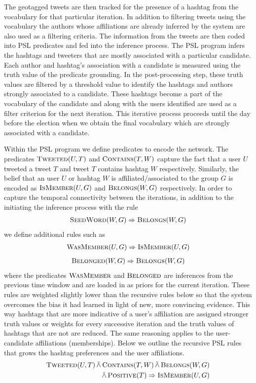 The geotagged tweets are then tracked for the presence of a hashtag from 
the vocabulary for that particular iteration.
In addition to filtering tweets using the vocabulary the authors whose affiliations are already inferred by the system are also used as a filtering criteria.
The information from
the tweets are then coded into PSL predicates and fed into the inference process.
The PSL program infers the hashtags and tweeters that are mostly associated with 
a particular candidate. 
Each author and hashtag's association with a candidate is measured using the truth value 
of the predicate grounding.
In the post-processing step, these truth values are filtered by a threshold value to identify the hashtags and authors strongly associated to a candidate.
These hashtags become a part of the vocabulary of the candidate and along with the users identified are used as a filter criterion for the next iteration.
This iterative process proceeds until the day before the election when we obtain the final vocabulary which are strongly associated with a candidate.

Within the PSL program we define predicates to encode the network. 
The predicates $\textsc{Tweeted}(U,T)$ and $\textsc{Contains}(T,W)$  capture the fact that a user $U$ tweeted a tweet $T$ and tweet $T$ contains hashtag $W$ respectively. 
Similarly, the belief that an user $U$ or hashtag $W$ is affiliated/associated to the group $G$ is encoded as $\textsc{IsMember}(U,G)$ and $\textsc{Belongs}(W,G)$ respectively.
In order to capture the temporal connectivity between the iterations, in addition to the initiating the inference process with the rule
\begin{align*}
\textsc{SeedWord}(W,G) \Rightarrow \textsc{Belongs}(W,G)
\end{align*}
we define additional rules such as
\begin{align*}
\textsc{WasMember}(U,G) \Rightarrow \textsc{IsMember}(U,G)
\end{align*}
\begin{align*}
\textsc{Belonged}(W,G) \Rightarrow \textsc{Belongs}(W,G)
\end{align*}
where the predicates $\textsc{WasMember}$ and $\textsc{Belonged}$ are inferences from the previous time window and are loaded in as  priors for the current iteration.
These rules are weighted slightly lower than the recursive rules below so that the system overcomes the bias it had learned in light of new, more convincing evidence.
This way hashtags that are more indicative of a user's affiliation are assigned stronger truth values or weights for every successive iteration and the truth values of hashtags that are not are reduced.
The same reasoning applies to the user-candidate affiliations (memberships).
Below we outline the recursive PSL rules that grows the hashtag preferences and the user affiliations. 
\begin{align*}
\begin{split}
\textsc{Tweeted}(U,T) 
	\softand \textsc{Contains}(T,W)
	\softand \textsc{Belongs}(W,G) \\ 
	\softand \textsc{Positive}(T)
	\Rightarrow \textsc{IsMember}(U,G)
\end{split}
\end{align*}

